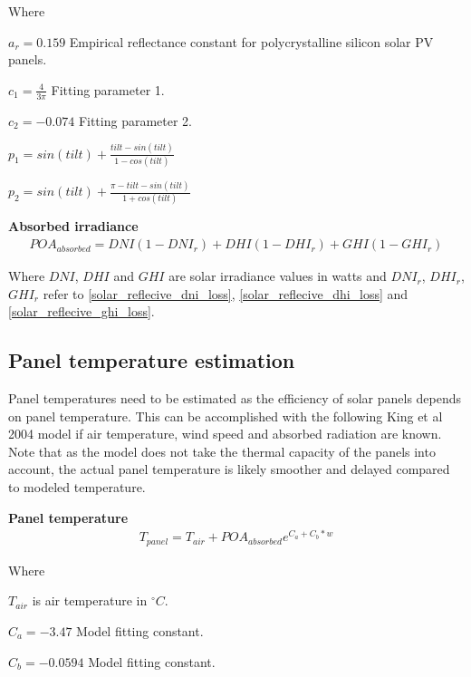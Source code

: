 \noindent Where

$a_r = 0.159$ Empirical reflectance constant for polycrystalline silicon solar PV panels.

$c_1= \frac{4}{3\pi}$  Fitting parameter 1.

$c_2 = -0.074$ Fitting parameter 2.

$p_1= sin(tilt) + \frac{tilt-sin(tilt)}{1-cos(tilt)}$

$p_2= sin(tilt) + \frac{\pi - tilt-sin(tilt)}{1+cos(tilt)}$


\noindent\textbf{Absorbed irradiance}
\begin{equation}
\begin{split}
\label{solar_reflecive_absorbed}
POA_{absorbed} = DNI(1-DNI_{r})+ DHI(1-DHI_{r})+GHI(1-GHI_{r})
\end{split}
\end{equation}

\noindent Where $DNI$, $DHI$ and $GHI$ are solar irradiance values in watts and $DNI_r$, $DHI_r$, $GHI_r$ refer to \ref{solar_reflecive_dni_loss}, \ref{solar_reflecive_dhi_loss} and \ref{solar_reflecive_ghi_loss}.





\subsection{Panel temperature estimation}
Panel temperatures need to be estimated as the efficiency of solar panels depends on panel temperature. This can be accomplished with the following King et al 2004 model\cite{king2004} if air temperature, wind speed and absorbed radiation are known. Note that as the model does not take the thermal capacity of the panels into account, the actual panel temperature is likely smoother and delayed compared to modeled temperature.

\noindent\textbf{Panel temperature}
\begin{equation}
\begin{split}
\label{panel_temp}
T_{panel} = T_{air} + POA_{absorbed} e ^{C_a+ C_b*w}
\end{split}
\end{equation}

\noindent Where 

$T_{air}$ is air temperature in $^\circ C$.

$C_a = -3.47$ Model fitting constant.

$C_b = -0.0594$ Model fitting constant. 

